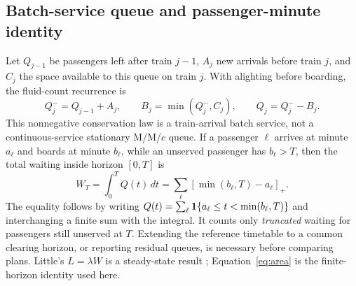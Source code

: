 \subsection{Batch-service queue and passenger-minute identity}
Let $Q_{j-1}$ be passengers left after train $j-1$, $A_j$ new arrivals before train $j$, and $C_j$ the space available to this queue on train $j$. With alighting before boarding, the fluid-count recurrence is
\begin{equation}
Q_j^-=Q_{j-1}+A_j,\qquad
B_j=\min(Q_j^-,C_j),\qquad
Q_j=Q_j^--B_j.
\label{eq:queue}
\end{equation}
This nonnegative conservation law is a train-arrival batch service, not a continuous-service stationary M/M/$c$ queue. If a passenger $\ell$ arrives at minute $a_\ell$ and boards at minute $b_\ell$, while an unserved passenger has $b_\ell>T$, then the total waiting inside horizon $[0,T]$ is
\begin{equation}
W_T=\int_0^T Q(t)\,dt
=\sum_\ell[\min(b_\ell,T)-a_\ell]_+ .
\label{eq:area}
\end{equation}
The equality follows by writing $Q(t)=\sum_\ell \mathbf 1\{a_\ell\leq t<\min(b_\ell,T)\}$ and interchanging a finite sum with the integral. It counts only \emph{truncated} waiting for passengers still unserved at $T$. Extending the reference timetable to a common clearing horizon, or reporting residual queues, is necessary before comparing plans. Little's $L=\lambda W$ is a steady-state result \cite{little}; Equation~\eqref{eq:area} is the finite-horizon identity used here.

